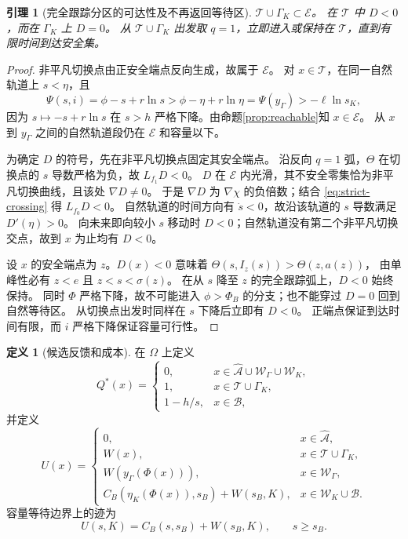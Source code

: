 \documentclass[11pt,a4paper,UTF8]{ctexart}
\newtheorem{lemma}[theorem]{引理}
\theoremstyle{definition}
\newtheorem{definition}[theorem]{定义}
\newcommand{\Acal}{\mathcal A}
\begin{document}
\begin{lemma}[完全跟踪分区的可达性及不再返回等待区]
\label{lem:tracking-region}
$\mathcal T\cup\Gamma_K\subset\mathcal E$。
在 $\mathcal T$ 中 $D<0$，而在 $\Gamma_K$ 上 $D=0$。
从 $\mathcal T\cup\Gamma_K$ 出发取 $q=1$，立即进入或保持在 $\mathcal T$，直到有限时间到达安全集。
\end{lemma}
\begin{proof}
非平凡切换点由正安全端点反向生成，故属于 $\mathcal E$。
对 $x\in\mathcal T$，在同一自然轨道上 $s<\eta$，且
\[
\Psi(s,i)=\phi-s+r\ln s>\phi-\eta+r\ln\eta=\Psi(y_\Gamma)>-\ell\ln s_K,
\]
因为 $s\mapsto-s+r\ln s$ 在 $s>h$ 严格下降。由命题\ref{prop:reachable}知 $x\in\mathcal E$。
从 $x$ 到 $y_\Gamma$ 之间的自然轨道段仍在 $\mathcal E$ 和容量以下。

为确定 $D$ 的符号，先在非平凡切换点固定其安全端点。
沿反向 $q=1$ 弧，$\Theta$ 在切换点的 $s$ 导数严格为负，故 $L_{f_1}D<0$。
$D$ 在 $\mathcal E$ 内光滑，其不安全零集恰为非平凡切换曲线，且该处 $\nabla D\ne0$。
于是 $\nabla D$ 为 $\nabla\chi$ 的负倍数；结合 \eqref{eq:strict-crossing} 得 $L_{f_0}D<0$。
自然轨道的时间方向有 $\dot s<0$，故沿该轨道的 $s$ 导数满足 $D'(\eta)>0$。
向未来即向较小 $s$ 移动时 $D<0$；自然轨道没有第二个非平凡切换交点，故到 $x$ 为止均有 $D<0$。

设 $x$ 的安全端点为 $z$。$D(x)<0$ 意味着 $\Theta(s,I_z(s))>\Theta(z,a(z))$，
由单峰性必有 $z<e$ 且 $z<s<\sigma(z)$。
在从 $s$ 降至 $z$ 的完全跟踪弧上，$D<0$ 始终保持。
同时 $\Phi$ 严格下降，故不可能进入 $\phi>\Phi_B$ 的分支；也不能穿过 $D=0$ 回到自然等待区。
从切换点出发时同样在 $s$ 下降后立即有 $D<0$。
正端点保证到达时间有限，而 $i$ 严格下降保证容量可行性。
\end{proof}

\begin{definition}[候选反馈和成本]
\label{def:candidate}
在 $\Omega$ 上定义
\begin{equation}
Q^*(x)=
\begin{cases}
0,&x\in\widehat{\Acal}\cup\mathcal W_\Gamma\cup\mathcal W_K,\\
1,&x\in\mathcal T\cup\Gamma_K,\\
1-h/s,&x\in\mathcal B,
\end{cases}
\label{eq:candidate-feedback}
\end{equation}
并定义
\begin{equation}
U(x)=
\begin{cases}
0,&x\in\widehat{\Acal},\\
W(x),&x\in\mathcal T\cup\Gamma_K,\\
W(y_\Gamma(\Phi(x))),&x\in\mathcal W_\Gamma,\\
C_B(\eta_K(\Phi(x)),s_B)+W(s_B,K),&x\in\mathcal W_K\cup\mathcal B.
\end{cases}
\label{eq:candidate-U}
\end{equation}
容量等待边界上的迹为
\begin{equation}
U(s,K)=C_B(s,s_B)+W(s_B,K),\qquad s\ge s_B.
\label{eq:boundary-value}
\end{equation}
\end{definition}
\end{document}
